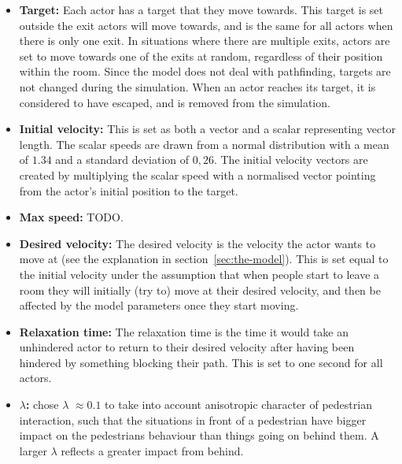 \begin{itemize}
    \item \textbf{Target:} Each actor has a target that they move towards. 
        This target is set outside the exit actors will move towards, and is 
        the same for all actors when there is only one exit. In situations 
        where there are multiple exits, actors are set to move towards one of 
        the exits at random, regardless of their position within the room. 
        Since the model does not deal with pathfinding, targets are not 
        changed during the simulation. When an actor reaches its target, it is 
        considered to have escaped, and is removed from the simulation.

    \item \textbf{Initial velocity:} This is set as both a vector and a scalar 
        representing vector length. The scalar speeds are drawn from a 
        normal distribution with a mean of $1.34$ and a standard deviation of 
        $0,26$. The initial velocity vectors are created by multiplying the 
        scalar speed with a normalised vector pointing from the actor's 
        initial position to the target.

    \item \textbf{Max speed:} TODO.

    \item \textbf{Desired velocity:} The desired velocity is the velocity the 
        actor wants to move at (see the explanation in 
        section~\ref{sec:the-model}). This is set equal to the initial velocity 
        under the assumption that when people start to leave a room they will 
        initially (try to) move at their desired velocity, and then be 
        affected by the model parameters once they start moving.

    \item \textbf{Relaxation time:} The relaxation time is the time it would 
        take an unhindered actor to return to their desired velocity after 
        having been hindered by something blocking their path. This is set to 
        one second for all actors.

    \item \textbf{$\lambda$:} \cite{ABconstant} chose $\lambda$ $\approx 0.1$ to take into account
	anisotropic character of pedestrian interaction, such that the situations in front of
	a pedestrian have bigger impact on the pedestrians behaviour than things going on
	behind them. A larger $\lambda$ reflects a greater impact from behind.
\end{itemize}

